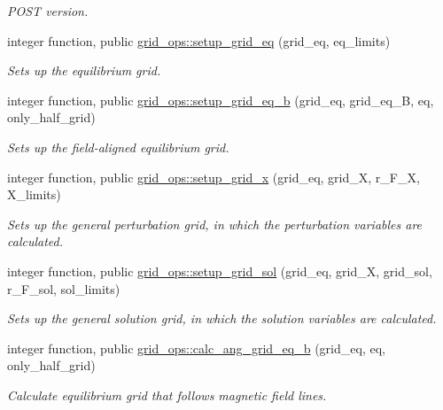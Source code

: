\begin{DoxyCompactItemize}
\begin{DoxyCompactList}\small\item\em P\+O\+ST version. \end{DoxyCompactList}\item 
integer function, public \hyperlink{namespacegrid__ops_af63366847d1caa64a7d329672292fd34}{grid\+\_\+ops\+::setup\+\_\+grid\+\_\+eq} (grid\+\_\+eq, eq\+\_\+limits)
\begin{DoxyCompactList}\small\item\em Sets up the equilibrium grid. \end{DoxyCompactList}\item 
integer function, public \hyperlink{namespacegrid__ops_ad16495ddd320562451c2325bafecf2d8}{grid\+\_\+ops\+::setup\+\_\+grid\+\_\+eq\+\_\+b} (grid\+\_\+eq, grid\+\_\+eq\+\_\+B, eq, only\+\_\+half\+\_\+grid)
\begin{DoxyCompactList}\small\item\em Sets up the field-\/aligned equilibrium grid. \end{DoxyCompactList}\item 
integer function, public \hyperlink{namespacegrid__ops_a1047889ec84da6e56aae619570a16988}{grid\+\_\+ops\+::setup\+\_\+grid\+\_\+x} (grid\+\_\+eq, grid\+\_\+X, r\+\_\+\+F\+\_\+X, X\+\_\+limits)
\begin{DoxyCompactList}\small\item\em Sets up the general perturbation grid, in which the perturbation variables are calculated. \end{DoxyCompactList}\item 
integer function, public \hyperlink{namespacegrid__ops_aeff1569cb9a043b03ed49250524fbd95}{grid\+\_\+ops\+::setup\+\_\+grid\+\_\+sol} (grid\+\_\+eq, grid\+\_\+X, grid\+\_\+sol, r\+\_\+\+F\+\_\+sol, sol\+\_\+limits)
\begin{DoxyCompactList}\small\item\em Sets up the general solution grid, in which the solution variables are calculated. \end{DoxyCompactList}\item 
integer function, public \hyperlink{namespacegrid__ops_a06107dbdfd1dd62e372cc29ab0255bad}{grid\+\_\+ops\+::calc\+\_\+ang\+\_\+grid\+\_\+eq\+\_\+b} (grid\+\_\+eq, eq, only\+\_\+half\+\_\+grid)
\begin{DoxyCompactList}\small\item\em Calculate equilibrium grid that follows magnetic field lines. \end{DoxyCompactList}\item 

\end{DoxyCompactItemize}
